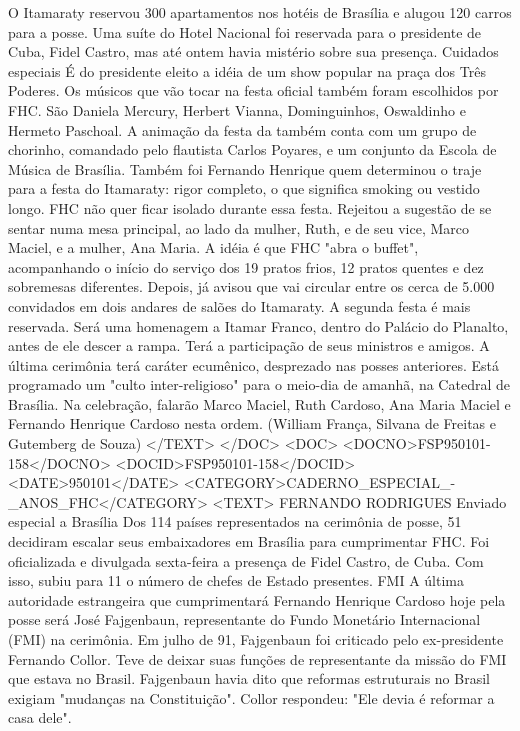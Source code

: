 O Itamaraty reservou 300 apartamentos nos hotéis de Brasília e alugou 120 carros para a posse. Uma suíte do Hotel Nacional foi reservada para o presidente de Cuba, Fidel Castro, mas até ontem havia mistério sobre sua presença.
Cuidados especiais 
É do presidente eleito a idéia de um show popular na praça dos Três Poderes.
Os músicos que vão tocar na festa oficial também foram escolhidos por FHC. São Daniela Mercury, Herbert Vianna, Dominguinhos, Oswaldinho e Hermeto Paschoal.
A animação da festa da também conta com um grupo de chorinho, comandado pelo flautista Carlos Poyares, e um conjunto da Escola de Música de Brasília.
Também foi Fernando Henrique quem determinou o traje para a festa do Itamaraty: rigor completo, o que significa smoking ou vestido longo.
FHC não quer ficar isolado durante essa festa. Rejeitou a sugestão de se sentar numa mesa principal, ao lado da mulher, Ruth, e de seu vice, Marco Maciel, e a mulher, Ana Maria.
A idéia é que FHC "abra o buffet", acompanhando o início do serviço dos 19 pratos frios, 12 pratos quentes e dez sobremesas diferentes. Depois, já avisou que vai circular entre os cerca de 5.000 convidados em dois andares de salões do Itamaraty.
A segunda festa é mais reservada. Será uma homenagem a Itamar Franco, dentro do Palácio do Planalto, antes de ele descer a rampa. Terá a participação de seus ministros e amigos.
A última cerimônia terá caráter ecumênico, desprezado nas posses anteriores. Está programado um "culto inter-religioso" para o meio-dia de amanhã, na Catedral de Brasília. Na celebração, falarão Marco Maciel, Ruth Cardoso, Ana Maria Maciel e Fernando Henrique Cardoso nesta ordem.
(William França, Silvana de Freitas e Gutemberg de Souza)
</TEXT>
</DOC>
<DOC>
<DOCNO>FSP950101-158</DOCNO>
<DOCID>FSP950101-158</DOCID>
<DATE>950101</DATE>
<CATEGORY>CADERNO_ESPECIAL_-_ANOS_FHC</CATEGORY>
<TEXT>
FERNANDO RODRIGUES 
Enviado especial a Brasília 
Dos 114 países representados na cerimônia de posse, 51 decidiram escalar seus embaixadores em Brasília para cumprimentar FHC. 
Foi oficializada e divulgada sexta-feira a presença de Fidel Castro, de Cuba. Com isso, subiu para 11 o número de chefes de Estado presentes.
FMI 
A última autoridade estrangeira que cumprimentará Fernando Henrique Cardoso hoje pela posse será José Fajgenbaun, representante do Fundo Monetário Internacional (FMI) na cerimônia.
Em julho de 91, Fajgenbaun foi criticado pelo ex-presidente Fernando Collor. Teve de deixar suas funções de representante da missão do FMI que estava no Brasil.
Fajgenbaun havia dito que reformas estruturais no Brasil exigiam "mudanças na Constituição". Collor respondeu: "Ele devia é reformar a casa dele".
